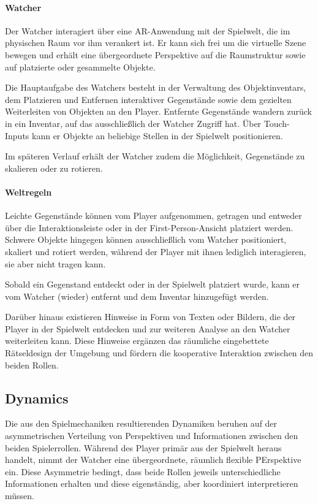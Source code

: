 \paragraph{Watcher}

Der Watcher interagiert über eine \ac{AR}-Anwendung mit der Spielwelt, die im physischen Raum vor ihm verankert ist. Er kann sich frei um die virtuelle Szene bewegen und erhält eine übergeordnete Perspektive auf die Raumstruktur sowie auf platzierte oder gesammelte Objekte.

Die Hauptaufgabe des Watchers besteht in der Verwaltung des Objektinventars, dem Platzieren und Entfernen interaktiver Gegenstände sowie dem gezielten Weiterleiten von Objekten an den Player. Entfernte Gegenstände wandern zurück in ein Inventar, auf das ausschließlich der Watcher Zugriff hat. Über Touch-Inputs kann er Objekte an beliebige Stellen in der Spielwelt positionieren.

Im späteren Verlauf erhält der Watcher zudem die Möglichkeit, Gegenstände zu skalieren oder zu rotieren.

\paragraph{Weltregeln}

Leichte Gegenstände können vom Player aufgenommen, getragen und entweder über die Interaktionsleiste oder in der First-Person-Ansicht platziert werden. Schwere Objekte hingegen können ausschließlich vom Watcher positioniert, skaliert und rotiert werden, während der Player mit ihnen lediglich interagieren, sie aber nicht tragen kann. 

Sobald ein Gegenstand entdeckt oder in der Spielwelt platziert wurde, kann er vom Watcher (wieder) entfernt und dem Inventar hinzugefügt werden.

Darüber hinaus existieren Hinweise in Form von Texten oder Bildern, die der Player in der Spielwelt entdecken und zur weiteren Analyse an den Watcher weiterleiten kann. Diese Hinweise ergänzen das räumliche eingebettete Rätseldesign der Umgebung und fördern die kooperative Interaktion zwischen den beiden Rollen.

\subsection{Dynamics}

Die aus den Spielmechaniken resultierenden Dynamiken beruhen auf der asymmetrischen Verteilung von Perspektiven und Informationen zwischen den beiden Spielerrollen. Während des Player primär aus der Spielwelt heraus handelt, nimmt der Watcher eine übergeordnete, räumlich flexible PErspektive ein. Diese Asymmetrie bedingt, dass beide Rollen jeweils unterschiedliche Informationen erhalten und diese eigenständig, aber koordiniert interpretieren müssen.

